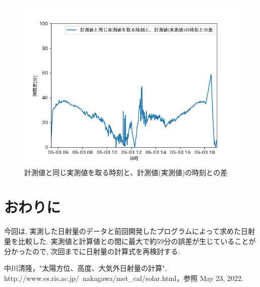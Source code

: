 \documentclass[a4j,12pt,]{jarticle}
\begin{document}
\begin{figure}[H]
  \begin{center}
    \includegraphics[width=160mm]{timeDiff.png}
    \caption{計測値と同じ実測値を取る時刻と、計測値(実測値)の時刻との差}
    \label{p2}
  \end{center}
\end{figure}

\section{おわりに}
今回は, 実測した日射量のデータと前回開発したプログラムによって求めた日射量を比較した.
実測値と計算値との間に最大で約59分の誤差が生じていることが分かったので, 次回までに日射量の計算式を再検討する.

\begin{thebibliography}{5}
  中川清隆，"太陽方位、高度、大気外日射量の計算", http://www.es.ris.ac.jp/~nakagawa/met\_cal/solar.html，参照 May 23, 2022.
\end{thebibliography}
\end{document}
